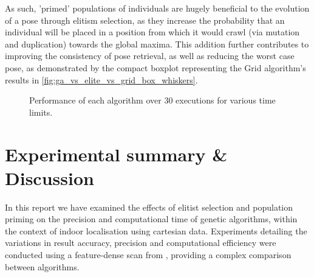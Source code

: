 \documentclass[authoryearcitations]{UoYCSproject}
\begin{document}
As such, 'primed' populations of individuals are hugely beneficial to the evolution of a pose through elitism selection, as they increase the probability that an individual will be placed in a position from which it would crawl (via mutation and duplication) towards the global maxima. This addition further contributes to improving the consistency of pose retrieval, as well as reducing the worst case pose, as demonstrated by the compact boxplot representing the Grid algorithm's results in \autoref{fig:ga_vs_elite_vs_grid_box_whiskers}.

\begin{figure}
	\caption[Grid, Elitism, Benchmark time-adjusted performance.]{Performance of each algorithm over 30 executions for various time limits.}
	\label{fig:ga_vs_elite_vs_grid_box_whiskers}
\end{figure}



\chapter{Experimental summary \& Discussion}
In this report we have examined the effects of elitist selection and population priming on the precision and computational time of genetic algorithms, within the context of indoor localisation using cartesian data. Experiments detailing the variations in result accuracy, precision and computational efficiency were conducted using a feature-dense scan from \citet{Lenac2011-co}, providing a complex comparison between algorithms. 
\end{document}
